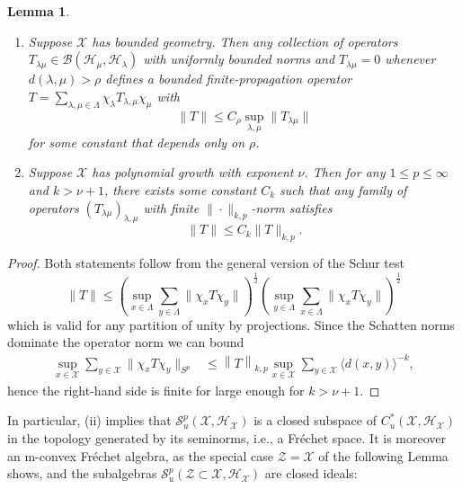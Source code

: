 \documentclass[12pt]{amsart}
\newtheorem{lemma}[theorem]{Lemma}
\newcommand{\Ss}{{\mathcal S}}
\newcommand{\Hh}{{\mathcal H}}
\newcommand{\Xx}{{\mathcal X}}
\newcommand{\Zz}{{\mathcal Z}}
\providecommand{\norm}[1]{\left \lVert#1 \right \rVert}
\begin{document}
\begin{lemma}
\label{lemma:schur_test}
\begin{enumerate}
    \item[(i)] Suppose $\Xx$ has bounded geometry. Then any collection of operators $T_{\lambda\mu}\in \mathcal B(\mathcal H_\mu,\mathcal H_\lambda)$ 
with uniformly bounded norms and $T_{\lambda\mu}=0$ whenever $d(\lambda,\mu)>\rho$ defines a bounded finite-propagation operator $T=\sum_{\lambda,\mu\in \Lambda}\chi_\lambda T_{\lambda,\mu} \chi_\mu$ with
$$\|T\|\leq C_\rho \sup_{\lambda,\mu} \|T_{\lambda \mu}\|$$
for some constant that depends only on $\rho$.
\item[(ii)] Suppose $\Xx$ has polynomial growth with exponent $\nu$. Then for any $1 \leq p \leq \infty$ and $k > \nu + 1$, there exists some constant $C_k$ such that any family of operators $(T_{\lambda\mu})_{\lambda,\mu}$ with finite $\|\cdot\|_{k,p}$-norm satisfies
$$\|T\|\leq C_{k} \|T\|_{k,p}.$$
\end{enumerate}
\end{lemma}
\begin{proof}
Both statements follow from the general version of the Schur test
$$\|T\| \leq \left( \sup_{x\in \Lambda} \sum_{y\in \Lambda} \|\chi_x T \chi_y\| \right)^\frac12 \left( \sup_{y\in \Lambda} \sum_{x\in \Lambda}\|\chi_x T \chi_y\|\right)^\frac12$$
which is valid for any partition of unity by projections. Since the Schatten norms dominate the operator norm we can bound
\begin{align*}
\sup_{x\in \Xx} \sum_{y\in \Xx} \|\chi_x T\chi_y\|_{S^p}&\leq \norm{T}_{k,p} \sup_{x\in \Xx} \sum_{y\in \Xx} \langle d(x,y)\rangle^{-k},
\end{align*}
hence the right-hand side is finite for large enough for $k>\nu+1$. 
\end{proof}
In particular, (ii) implies that $\Ss^p_u(\Xx, \Hh_\Xx)$ is a closed subspace of $C^*_u(\Xx,\Hh_\Xx)$ in the topology generated by its seminorms, i.e., a Fr\'echet space.
It is moreover an m-convex Fr\'echet algebra, as the special case $\Zz=\Xx$ of the following Lemma shows, and the subalgebras $\Ss^p_u(\Zz\subset \Xx,\Hh_\Xx)$ are closed ideals: 
\end{document}

